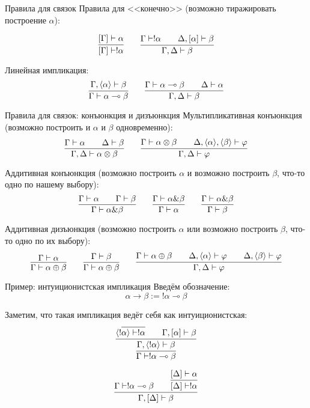 \documentclass[aspectratio=169,dvipsnames,usenames]{beamer}
\begin{document}
\begin{frame}{Правила для связок}
Правила для <<конечно>> (возможно тиражировать построение $\alpha$):

$$\infer{[\Gamma]\vdash !\alpha}{[\Gamma]\vdash\alpha}\quad\quad\infer{\Gamma,\Delta\vdash\beta}{\Gamma\vdash!\alpha\quad\quad\Delta,[\alpha]\vdash\beta}$$

Линейная импликация:
$$\infer{\Gamma\vdash\alpha\multimap\beta}{\Gamma,\langle\alpha\rangle\vdash\beta}\quad\quad\infer{\Gamma,\Delta\vdash\beta}{\Gamma\vdash\alpha\multimap\beta\quad\quad\Delta\vdash\alpha}$$
\end{frame}

\begin{frame}{Правила для связок: конъюнкция и дизъюнкция}
Мультипликативная конъюнкция (возможно построить и $\alpha$ и $\beta$ одновременно):
$$\infer{\Gamma,\Delta\vdash\alpha\otimes\beta}{\Gamma\vdash\alpha\quad\quad\Delta\vdash\beta}\quad\quad\infer{\Gamma,\Delta\vdash\varphi}{\Gamma\vdash\alpha\otimes\beta\quad\quad\Delta,\langle\alpha\rangle,\langle\beta\rangle\vdash\varphi}$$

Аддитивная конъюнкция (возможно построить $\alpha$ и возможно построить $\beta$, что-то одно по нашему выбору):
$$\infer{\Gamma\vdash\alpha\&\beta}{\Gamma\vdash\alpha\quad\quad\Gamma\vdash\beta}\quad\quad\infer{\Gamma\vdash\alpha}{\Gamma\vdash\alpha\&\beta}\quad\quad\infer{\Gamma\vdash\beta}{\Gamma\vdash\alpha\&\beta}$$

Аддитивная дизъюнкция (возможно построить $\alpha$ или возможно построить $\beta$, что-то одно по их выбору):
$$\infer{\Gamma\vdash\alpha\oplus\beta}{\Gamma\vdash\alpha}\quad\quad\infer{\Gamma\vdash\alpha\oplus\beta}{\Gamma\vdash\beta}\quad\quad
  \infer{\Gamma,\Delta\vdash\varphi}{\Gamma\vdash\alpha\oplus\beta\quad\quad\Delta,\langle\alpha\rangle\vdash\varphi\quad\quad\Delta,\langle\beta\rangle\vdash\varphi}$$

\end{frame}

\begin{frame}{Пример: интуиционистская импликация}
Введём обозначение: $$\alpha\rightarrow\beta := !\alpha\multimap\beta$$

Заметим, что такая импликация ведёт себя как интуиционистская:
$$\infer{\Gamma\vdash !\alpha\multimap\beta}{\infer{\Gamma,\langle!\alpha\rangle\vdash\beta}{\langle!\infer{\alpha\rangle\vdash!\alpha}{}\quad\quad\Gamma,[\alpha]\vdash\beta}}$$

$$\infer{\Gamma,[\Delta]\vdash\beta}{\Gamma\vdash!\alpha\multimap\beta\quad\quad\infer{[\Delta]\vdash!\alpha}{[\Delta]\vdash\alpha}}$$
\end{frame}
\end{document}
